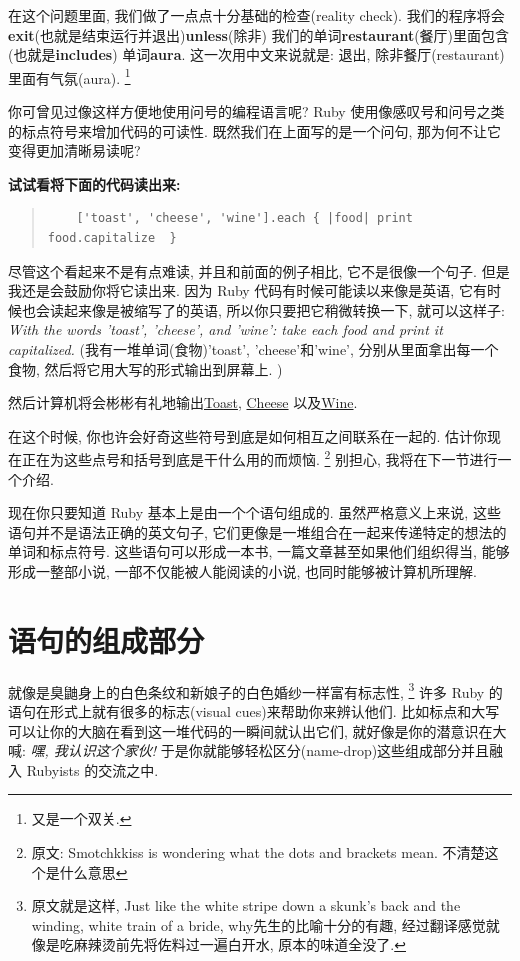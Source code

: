 在这个问题里面, 我们做了一点点十分基础的检查(reality check). 
我们的程序将会\textbf{exit}(也就是结束运行并退出)\textbf{unless}(除非)
我们的单词\textbf{restaurant}(餐厅)里面包含(也就是\textbf{includes})
单词\textbf{aura}. 这一次用中文来说就是: 退出, 
除非餐厅(restaurant)里面有气氛(aura). 
\footnote{又是一个双关. }

你可曾见过像这样方便地使用问号的编程语言呢? 
Ruby 使用像感叹号和问号之类的标点符号来增加代码的可读性. 
既然我们在上面写的是一个问句, 那为何不让它变得更加清晰易读呢? 

\textbf{试试看将下面的代码读出来: }
\begin{quotation}
  \begin{verbatim}
    ['toast', 'cheese', 'wine'].each { |food| print food.capitalize  }
  \end{verbatim}
\end{quotation}

尽管这个看起来不是有点难读, 并且和前面的例子相比, 它不是很像一个句子. 
但是我还是会鼓励你将它读出来. 因为 Ruby 代码有时候可能读以来像是英语, 
它有时候也会读起来像是被缩写了的英语, 所以你只要把它稍微转换一下, 
就可以这样子: \emph{With the words 'toast', 'cheese', and 'wine': take each food and print it capitalized.}
(我有一堆单词(食物)'toast', 'cheese'和'wine', 分别从里面拿出每一个食物, 
然后将它用大写的形式输出到屏幕上. )

然后计算机将会彬彬有礼地输出\underline{Toast}, \underline{Cheese}
以及\underline{Wine}.

在这个时候, 你也许会好奇这些符号到底是如何相互之间联系在一起的. 
估计你现在正在为这些点号和括号到底是干什么用的而烦恼. 
\footnote{原文: Smotchkkiss is wondering what the dots and brackets mean. 不清楚这个是什么意思}
别担心, 我将在下一节进行一个介绍. 

现在你只要知道 Ruby 基本上是由一个个语句组成的. 虽然严格意义上来说, 
这些语句并不是语法正确的英文句子, 
它们更像是一堆组合在一起来传递特定的想法的单词和标点符号. 
这些语句可以形成一本书, 一篇文章甚至如果他们组织得当, 能够形成一整部小说, 
一部不仅能被人能阅读的小说, 也同时能够被计算机所理解. 

\section{语句的组成部分}
就像是臭鼬身上的白色条纹和新娘子的白色婚纱一样富有标志性, 
\footnote{原文就是这样, Just like the white stripe down a skunk's back and the winding, white train of a bride, why先生的比喻十分的有趣, 经过翻译感觉就像是吃麻辣烫前先将佐料过一遍白开水, 原本的味道全没了. }
许多 Ruby 的语句在形式上就有很多的标志(visual cues)来帮助你来辨认他们. 
比如标点和大写可以让你的大脑在看到这一堆代码的一瞬间就认出它们, 
就好像是你的潜意识在大喊: \emph{嘿, 我认识这个家伙! }
于是你就能够轻松区分(name-drop)这些组成部分并且融入 Rubyists 的交流之中. 


